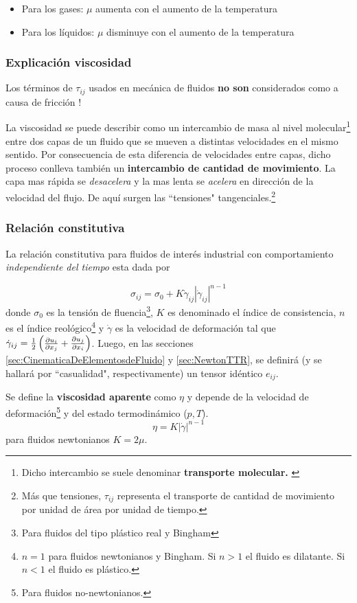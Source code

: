 \begin{itemize}
    \item Para los gases: $\mu$ aumenta con el aumento de la temperatura
    \item Para los líquidos: $\mu$ disminuye con el aumento de la temperatura
\end{itemize}
\subsubsection*{Explicación viscosidad}
Los términos de $\tau_{ij}$ usados en mecánica de fluidos \textbf{no son} considerados como a causa de fricción \citep{durst2008fluid}! 

La viscosidad se puede describir como un intercambio de masa al nivel molecular\footnote{Dicho intercambio se suele denominar \textbf{transporte molecular.} \label{foot:transporteMolecular}} entre dos capas de un fluido que se mueven a distintas velocidades en el mismo sentido. Por consecuencia de esta diferencia de velocidades entre capas, dicho proceso conlleva también un \textbf{intercambio de cantidad de movimiento}. La capa mas rápida se \textit{desacelera} y la mas lenta se \textit{acelera} en dirección de la velocidad del flujo. De aquí surgen las ``tensiones"{} tangenciales.\footnote{Más que tensiones, $\tau_{ij}$ representa el transporte de cantidad de movimiento por unidad de área por unidad de tiempo.}


\subsubsection*{Relación constitutiva}
La relación constitutiva para fluidos de interés industrial con comportamiento \textit{independiente del tiempo} esta dada por

\[
\sigma_{ij}=\sigma_0+K\dot{\gamma}_{ij} \left| \dot{\gamma}_{ij}\right|^{n-1}
\]
donde $\sigma_0$ es la tensión de fluencia\footnote{Para fluidos del tipo plástico real y Bingham}, $K$ es denominado el índice de consistencia, $n$ es el índice reológico\footnote{$n=1$ para fluidos newtonianos y Bingham. Si $n>1$ el fluido es dilatante. Si $n<1$ el fluido es plástico.} y $\dot{\gamma}$ es la velocidad de deformación tal que $\dot{\gamma}_{ij}=\frac{1}{2}\left( \frac{\partial u_i}{\partial x_j}+\frac{\partial u_j}{\partial x_i}\right)$. Luego, en las secciones \ref{sec:CinematicaDeElementosdeFluido} y \ref{sec:NewtonTTR}, se definirá (y se hallará por ``casualidad", respectivamente) un tensor idéntico $e_{ij}$.

Se define la \textbf{viscosidad aparente} como $\eta$ y depende de la velocidad de deformación\footnote{Para fluidos no-newtonianos.} y del estado termodinámico ($p,T$).
\[
\eta=K\left| \dot{\gamma} \right|^{n-1}
\]
para fluidos newtonianos $K=2\mu$.

